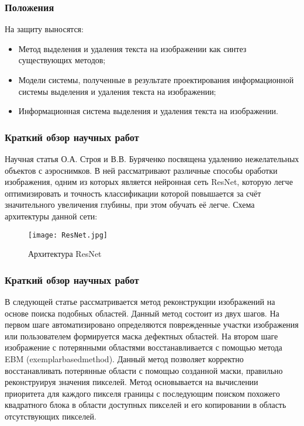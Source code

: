 \documentclass[
	fullscreen=true, 
	bookmarks=false,
	sans serif,
	9pt,
	pdf,
	hyperref={
		pdfpagelabels=false,
		unicode=true
	}
]{beamer}
\begin{document}
	\begin{frame}\frametitle{Положения}
	На защиту выносятся:
		\begin{itemize}
			\item Метод выделения и удаления текста на изображении как синтез существующих методов;
			\item Модели системы, полученные в результате проектирования информационной системы выделения и удаления текста на изображении;
			\item Информационная система выделения и удаления текста на изображении.
		\end{itemize}
	\end{frame}

	\begin{frame}[fragile]\frametitle{Краткий обзор научных работ}	
		Научная статья  О.А. Строя и В.В. Буряченко посвящена удалению нежелательных объектов с аэроснимков. В ней рассматривают различные способы оработки изображения, одним из которых является нейронная сеть ResNet, которую легче оптимизировать и точность классификации которой повышается за счёт значительного увеличения глубины, при этом обучать её легче. Схема архитектуры данной сети:
		\begin{figure}[h]
            \centering
            \texttt{[image: ResNet.jpg]}
            \caption{Архитектура ResNet}
            \label{fig:1}
        \end{figure}
	\end{frame}
	
	\begin{frame}[fragile]\frametitle{Краткий обзор научных работ}	
        В следующей статье рассматривается метод реконструкции изображений на основе поиска подобных областей. Данный метод состоит из двух шагов. На первом шаге автоматизировано определяются поврежденные участки изображения или пользователем формируется маска дефектных областей. На втором шаге изображение с потерянными областями восстанавливается с помощью метода EBM (exemplarbasedmethod). Данный метод позволяет корректно восстанавливать потерянные области с помощью созданной маски, правильно реконструируя значения пикселей. Метод основывается на вычислении приоритета для каждого пикселя границы с последующим поиском похожего квадратного блока в области доступных пикселей и его копировании в область отсутствующих пикселей.
	\end{frame}
	
\end{document}
